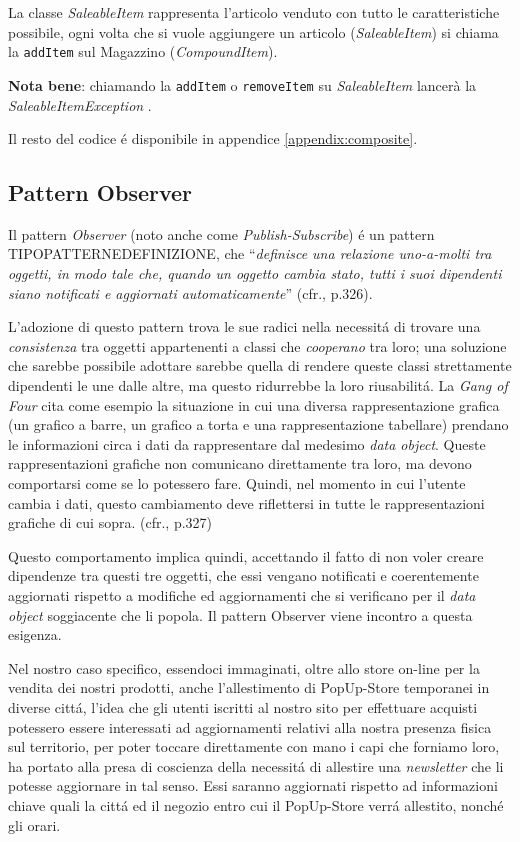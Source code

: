\documentclass[12pt]{article}
\begin{document}
La classe \textit{SaleableItem} rappresenta l'articolo venduto con tutto le caratteristiche possibile, ogni volta che si vuole aggiungere un articolo (\textit{SaleableItem}) si chiama la {\tt addItem} sul Magazzino (\textit{CompoundItem}).

\textbf{Nota bene}: chiamando la {\tt addItem} o {\tt removeItem} su \textit{SaleableItem} lancerà la \textit{SaleableItemException} \cite{gof_riferimento}.

Il resto del codice \'e disponibile in appendice \ref{appendix:composite}.


\subsection{Pattern Observer}

Il pattern \textit{Observer} (noto anche come \textit{Publish-Subscribe}) \'e un pattern TIPOPATTERNEDEFINIZIONE, che ``\textit{definisce una relazione uno-a-molti tra oggetti, in modo tale che, quando un oggetto cambia stato, tutti i suoi dipendenti siano notificati e aggiornati automaticamente}'' (cfr.\cite{gof_riferimento}, p.326). 

L'adozione di questo pattern trova le sue radici nella necessit\'a di trovare una \textit{consistenza} tra oggetti appartenenti a classi che \textit{cooperano} tra loro; una soluzione che sarebbe possibile adottare sarebbe quella di rendere queste classi strettamente dipendenti le une dalle altre, ma questo ridurrebbe la loro riusabilit\'a. La \textit{Gang of Four} cita come esempio la situazione in cui una diversa rappresentazione grafica (un grafico a barre, un grafico a torta e una rappresentazione tabellare) prendano le informazioni circa i dati da rappresentare dal medesimo \textit{data object}. Queste rappresentazioni grafiche non comunicano direttamente tra loro, ma devono comportarsi come se lo potessero fare. Quindi, nel momento in cui l'utente cambia i dati, questo cambiamento deve riflettersi in tutte le rappresentazioni grafiche di cui sopra. (cfr.\cite{gof_riferimento}, p.327)

Questo comportamento implica quindi, accettando il fatto di non voler creare dipendenze tra questi tre oggetti, che essi vengano notificati e coerentemente aggiornati rispetto a modifiche ed aggiornamenti che si verificano per il \textit{data object} soggiacente che li popola. Il pattern Observer viene incontro a questa esigenza. 

Nel nostro caso specifico, essendoci immaginati, oltre allo store on-line per la vendita dei nostri prodotti, anche l'allestimento di PopUp-Store temporanei in diverse citt\'a, l'idea che gli utenti iscritti al nostro sito per effettuare acquisti potessero essere interessati ad aggiornamenti relativi alla nostra presenza fisica sul territorio, per poter toccare direttamente con mano i capi che forniamo loro, ha portato alla presa di coscienza della necessit\'a di allestire una \textit{newsletter} che li potesse aggiornare in tal senso. Essi saranno aggiornati rispetto ad informazioni chiave quali la citt\'a ed il negozio entro cui il PopUp-Store verr\'a allestito, nonch\'e gli orari. 
\end{document}
